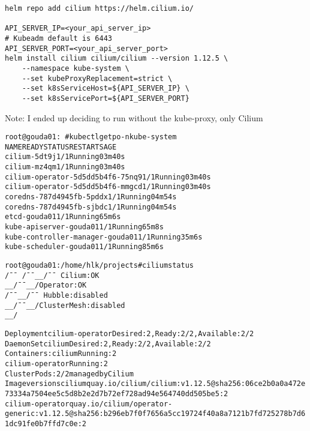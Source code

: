 \documentclass[Screen16to9,17pt]{foils}
\begin{document}

\begin{verbatim}
helm repo add cilium https://helm.cilium.io/

API_SERVER_IP=<your_api_server_ip>
# Kubeadm default is 6443
API_SERVER_PORT=<your_api_server_port>
helm install cilium cilium/cilium --version 1.12.5 \
    --namespace kube-system \
    --set kubeProxyReplacement=strict \
    --set k8sServiceHost=${API_SERVER_IP} \
    --set k8sServicePort=${API_SERVER_PORT}
\end{verbatim}

\begin{list2}
\item
\end{list2}
Note: I ended up deciding to run without the kube-proxy, only Cilium


\begin{alltt}
root@gouda01:~#  kubectl get po -n kube-system
NAME                               READY   STATUS    RESTARTS   AGE
cilium-5dt9j                       1/1     Running   0          3m40s
cilium-mz4qm                       1/1     Running   0          3m40s
cilium-operator-5d5dd5b4f6-75nq9   1/1     Running   0          3m40s
cilium-operator-5d5dd5b4f6-mmgcd   1/1     Running   0          3m40s
coredns-787d4945fb-5pddx           1/1     Running   0          4m54s
coredns-787d4945fb-sjbdc           1/1     Running   0          4m54s
etcd-gouda01                       1/1     Running   6          5m6s
kube-apiserver-gouda01             1/1     Running   6          5m8s
kube-controller-manager-gouda01    1/1     Running   3          5m6s
kube-scheduler-gouda01             1/1     Running   8          5m6s
\end{alltt}


\slide{Cilium CLI tool}

\begin{alltt}
root@gouda01:/home/hlk/projects# cilium status
    /¯¯\
 /¯¯\__/¯¯\    Cilium:         OK
 \__/¯¯\__/    Operator:       OK
 /¯¯\__/¯¯\    Hubble:         disabled
 \__/¯¯\__/    ClusterMesh:    disabled
    \__/

Deployment        cilium-operator    Desired: 2, Ready: 2/2, Available: 2/2
DaemonSet         cilium             Desired: 2, Ready: 2/2, Available: 2/2
Containers:       cilium             Running: 2
                  cilium-operator    Running: 2
Cluster Pods:     2/2 managed by Cilium
Image versions    cilium             quay.io/cilium/cilium:v1.12.5@sha256:06ce2b0a0a472e73334a7504ee5c5d8b2e2d7b72ef728ad94e564740dd505be5: 2
                  cilium-operator    quay.io/cilium/operator-generic:v1.12.5@sha256:b296eb7f0f7656a5cc19724f40a8a7121b7fd725278b7d61dc91fe0b7ffd7c0e: 2
\end{alltt}
\end{document}
